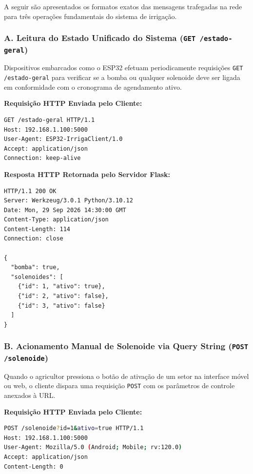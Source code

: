 A seguir são apresentados os formatos exatos das mensagens trafegadas na rede para três operações fundamentais do sistema de irrigação.

\subsubsection*{A. Leitura do Estado Unificado do Sistema (\texttt{GET /estado-geral})}

Dispositivos embarcados como o ESP32 efetuam periodicamente requisições \texttt{GET /estado-geral} para verificar se a bomba ou qualquer solenoide deve ser ligada em conformidade com o cronograma de agendamento ativo.

\textbf{Requisição HTTP Enviada pelo Cliente:}
\begin{lstlisting}[language=bash]
GET /estado-geral HTTP/1.1
Host: 192.168.1.100:5000
User-Agent: ESP32-IrrigaClient/1.0
Accept: application/json
Connection: keep-alive


\end{lstlisting}

\textbf{Resposta HTTP Retornada pelo Servidor Flask:}
\begin{lstlisting}
HTTP/1.1 200 OK
Server: Werkzeug/3.0.1 Python/3.10.12
Date: Mon, 29 Sep 2026 14:30:00 GMT
Content-Type: application/json
Content-Length: 114
Connection: close

{
  "bomba": true,
  "solenoides": [
    {"id": 1, "ativo": true},
    {"id": 2, "ativo": false},
    {"id": 3, "ativo": false}
  ]
}
\end{lstlisting}

\subsubsection*{B. Acionamento Manual de Solenoide via Query String (\texttt{POST /solenoide})}

Quando o agricultor pressiona o botão de ativação de um setor na interface móvel ou web, o cliente dispara uma requisição \texttt{POST} com os parâmetros de controle anexados à URL.

\textbf{Requisição HTTP Enviada pelo Cliente:}
\begin{lstlisting}[language=bash]
POST /solenoide?id=1&ativo=true HTTP/1.1
Host: 192.168.1.100:5000
User-Agent: Mozilla/5.0 (Android; Mobile; rv:120.0)
Accept: application/json
Content-Length: 0


\end{lstlisting}

